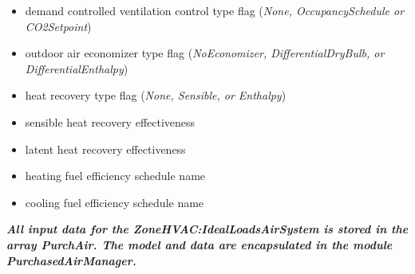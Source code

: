 \begin{itemize}
  \item demand controlled ventilation control type flag (\emph{None, OccupancySchedule or CO2Setpoint})
  \item outdoor air economizer type flag (\emph{NoEconomizer, DifferentialDryBulb, or DifferentialEnthalpy})
  \item heat recovery type flag (\emph{None, Sensible, or Enthalpy})
  \item sensible heat recovery effectiveness
  \item latent heat recovery effectiveness
  \item heating fuel efficiency schedule name
  \item cooling fuel efficiency schedule name
\end{itemize}

\emph{\textbf{All input data for the ZoneHVAC:IdealLoadsAirSystem is stored in the array PurchAir. The model and data are encapsulated in the module PurchasedAirManager.}}

